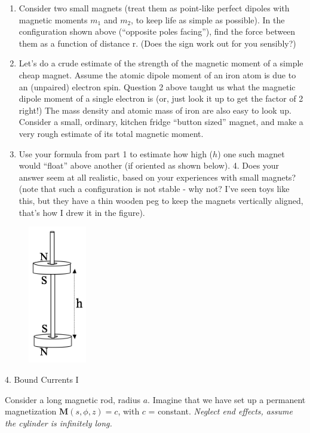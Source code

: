 \documentclass[11pt]{article}
\def\tightlist{}
\begin{document}
\begin{enumerate}
\def\labelenumi{\arabic{enumi}.}
\tightlist
\item
  Consider two small magnets (treat them as point-like perfect dipoles
  with magnetic moments \(m_1\) and \(m_2\), to keep life as simple as
  possible). In the configuration shown above (``opposite poles
  facing''), find the force between them as a function of distance r.
  (Does the sign work out for you sensibly?)
\item
  Let's do a crude estimate of the strength of the magnetic moment of a
  simple cheap magnet. Assume the atomic dipole moment of an iron atom
  is due to an (unpaired) electron spin. Question 2 above taught us what
  the magnetic dipole moment of a single electron is (or, just look it
  up to get the factor of 2 right!) The mass density and atomic mass of
  iron are also easy to look up. Consider a small, ordinary, kitchen
  fridge ``button sized'' magnet, and make a very rough estimate of its
  total magnetic moment.
\item
  Use your formula from part 1 to estimate how high (\(h\)) one such
  magnet would ``float'' above another (if oriented as shown below). 4.
  Does your answer seem at all realistic, based on your experiences with
  small magnets? (note that such a configuration is not stable - why
  not? I've seen toys like this, but they have a thin wooden peg to keep
  the magnets vertically aligned, that's how I drew it in the figure).
\end{enumerate}

\begin{figure}[htbp]
\centering
\includegraphics[width=1in]{./images/hw11/two_magnets.png}
\end{figure}

{\Large 4. Bound Currents I}\label{bound-currents-i}

Consider a long magnetic rod, radius \(a\). Imagine that we have set up
a permanent magnetization \(\mathbf{M}(s,\phi,z) = c\), with \(c\) =
constant. \emph{Neglect end effects, assume the cylinder is infinitely
long.}
\end{document}
